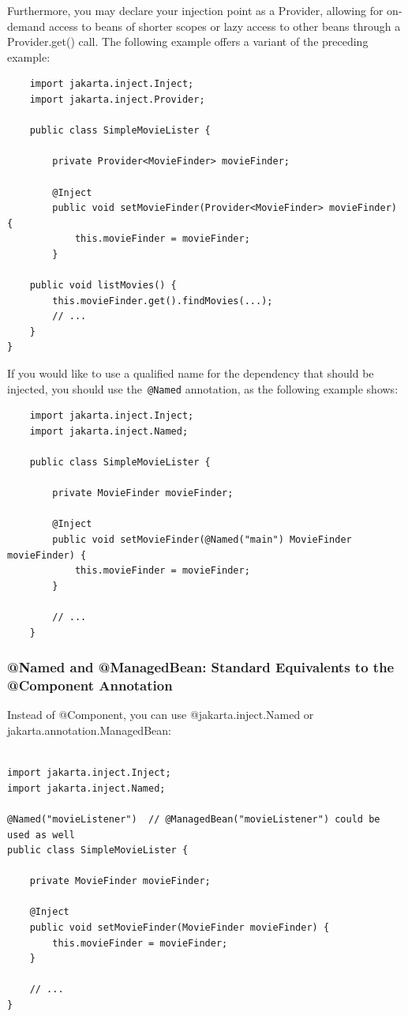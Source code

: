 \documentclass{scrartcl}
\begin{document}
Furthermore, you may declare your injection point as a Provider, allowing for on-demand access to beans of shorter scopes or lazy access to other beans through a Provider.get() call. The following example offers a variant of the preceding example:

\begin{lstlisting}
    import jakarta.inject.Inject;
    import jakarta.inject.Provider;

    public class SimpleMovieLister {

        private Provider<MovieFinder> movieFinder;

        @Inject
        public void setMovieFinder(Provider<MovieFinder> movieFinder) {
            this.movieFinder = movieFinder;
        }

    public void listMovies() {
        this.movieFinder.get().findMovies(...);
        // ...
    }
}
\end{lstlisting}

If you would like to use a qualified name for the dependency that should be injected, you should use the\lstinline| @Named| annotation, as the following example shows:

\begin{lstlisting}
    import jakarta.inject.Inject;
    import jakarta.inject.Named;

    public class SimpleMovieLister {

        private MovieFinder movieFinder;

        @Inject
        public void setMovieFinder(@Named("main") MovieFinder movieFinder) {
            this.movieFinder = movieFinder;
        }

        // ...
    }
\end{lstlisting}

\subsubsection{@Named and @ManagedBean: Standard Equivalents to the @Component Annotation}

Instead of @Component, you can use @jakarta.inject.Named or jakarta.annotation.ManagedBean:

\begin{lstlisting}

import jakarta.inject.Inject;
import jakarta.inject.Named;

@Named("movieListener")  // @ManagedBean("movieListener") could be used as well
public class SimpleMovieLister {

    private MovieFinder movieFinder;

    @Inject
    public void setMovieFinder(MovieFinder movieFinder) {
        this.movieFinder = movieFinder;
    }

    // ...
}
\end{lstlisting}
\end{document}
